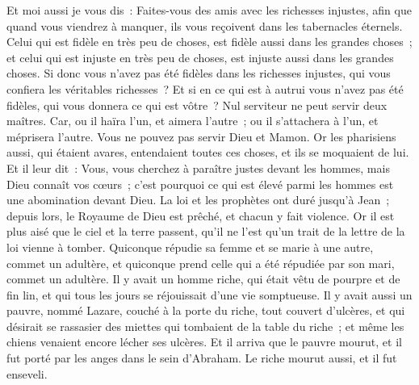 \begin{multicols}{2}
Et moi aussi je vous dis~: Faites-vous des amis avec les richesses injustes, afin que quand vous viendrez à manquer, ils vous reçoivent dans les tabernacles éternels.
Celui qui est fidèle en très peu de choses, est fidèle aussi dans les grandes choses~; et celui qui est injuste en très peu de choses, est injuste aussi dans les grandes choses.
Si donc vous n'avez pas été fidèles dans les richesses injustes, qui vous confiera les véritables richesses~?
Et si en ce qui est à autrui vous n'avez pas été fidèles, qui vous donnera ce qui est vôtre~?
Nul serviteur ne peut servir deux maîtres. Car, ou il haïra l'un, et aimera l'autre~; ou il s'attachera à l'un, et méprisera l'autre. Vous ne pouvez pas servir Dieu et Mamon.
Or les pharisiens aussi, qui étaient avares, entendaient toutes ces choses, et ils se moquaient de lui.
Et il leur dit~: Vous, vous cherchez à paraître justes devant les hommes, mais Dieu connaît vos cœurs~; c'est pourquoi ce qui est élevé parmi les hommes est une abomination devant Dieu.
La loi et les prophètes ont duré jusqu'à Jean~; depuis lors, le Royaume de Dieu est prêché, et chacun y fait violence.
Or il est plus aisé que le ciel et la terre passent, qu'il ne l'est qu'un trait de la lettre de la loi vienne à tomber.
Quiconque répudie sa femme et se marie à une autre, commet un adultère, et quiconque prend celle qui a été répudiée par son mari, commet un adultère.
Il y avait un homme riche, qui était vêtu de pourpre et de fin lin, et qui tous les jours se réjouissait d'une vie somptueuse.
Il y avait aussi un pauvre, nommé Lazare, couché à la porte du riche, tout couvert d'ulcères,
et qui désirait se rassasier des miettes qui tombaient de la table du riche~; et même les chiens venaient encore lécher ses ulcères.
Et il arriva que le pauvre mourut, et il fut porté par les anges dans le sein d'Abraham. Le riche mourut aussi, et il fut enseveli.

\end{multicols}
